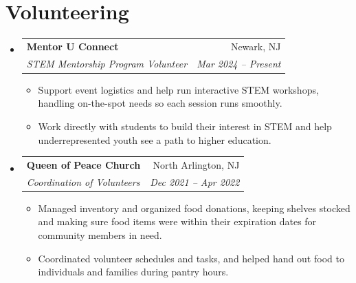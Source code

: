 \documentclass[letterpaper,11pt]{article}
\makeatletter
\newcommand{\resumeItem}[1]{\item\small{#1}}
\newcommand{\resumeSubheading}[4]{
  \vspace{-2pt}\item
    \begin{tabular*}{0.97\textwidth}[t]{l@{\extracolsep{\fill}}r}
      \textbf{#1} & #2 \\
      \textit{\small#3} & \textit{\small #4} \\
    \end{tabular*}\vspace{-7pt}
}
\newcommand{\resumeSubHeadingListStart}{\begin{itemize}[leftmargin=0.15in, label={}, itemsep=1pt, parsep=0pt, topsep=2pt]}
\newcommand{\resumeSubHeadingListEnd}{\end{itemize}}
\newcommand{\resumeItemListStart}{\begin{itemize}[topsep=6pt,itemsep=0pt,parsep=0pt,partopsep=0pt]}
\newcommand{\resumeItemListEnd}{\end{itemize}\vspace{-5pt}}
\makeatother
\begin{document}
\section{Volunteering}
  \resumeSubHeadingListStart
    \resumeSubheading
      {Mentor U Connect}{Newark, NJ}
      {STEM Mentorship Program Volunteer}{Mar 2024 -- Present}
      \resumeItemListStart
        \resumeItem{Support event logistics and help run interactive STEM workshops, handling on-the-spot needs so each session runs smoothly.}
        \resumeItem{Work directly with students to build their interest in STEM and help underrepresented youth see a path to higher education.}
      \resumeItemListEnd
    \resumeSubheading
      {Queen of Peace Church}{North Arlington, NJ}
      {Coordination of Volunteers}{Dec 2021 -- Apr 2022}
      \resumeItemListStart
        \resumeItem{Managed inventory and organized food donations, keeping shelves stocked and making sure food items were within their expiration dates for community members in need.}
        \resumeItem{Coordinated volunteer schedules and tasks, and helped hand out food to individuals and families during pantry hours.}
      \resumeItemListEnd
  \resumeSubHeadingListEnd
\end{document}
